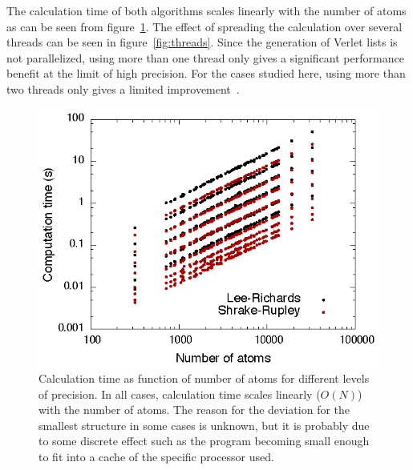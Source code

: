 \documentclass[a4paper,11pt]{article}
\begin{document}
The calculation time of both algorithms scales linearly with the
number of atoms as can be seen from figure~\ref{fig:scaling}. The
effect of spreading the calculation over several threads can be seen
in figure~\ref{fig:threads}. Since the generation of Verlet lists is
not parallelized, using more than one thread only gives a significant
performance benefit at the limit of high precision. For the cases
studied here, using more than two threads only gives a limited
improvement~\cite{4cores}.
\begin{figure}
  \begin{center}
  \includegraphics{fig/scaling}
  \caption{Calculation time as function of number of atoms for
    different levels of precision. In all cases, calculation time
    scales linearly ($O(N)$) with the number of atoms. The reason for
    the deviation for the smallest structure in some cases is unknown,
    but it is probably due to some discrete effect such as the program
    becoming small enough to fit into a cache of the specific
    processor used.
    \label{fig:scaling}}
  \end{center}
\end{figure}
\end{document}

